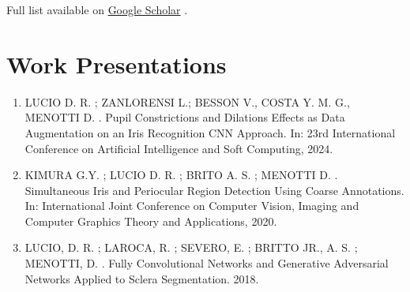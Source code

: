 \documentclass[12pt,a4paper,sans]{moderncv}        %
\begin{document}
\vspace{8pt}
Full list available on \href{https://scholar.google.com.br/citations?user=FS_momQAAAAJ&hl=en}{Google Scholar} .

\vspace{12pt}
\section{Work Presentations}

\begin{enumerate}
    \item LUCIO D. R. ; ZANLORENSI L.; BESSON V., COSTA Y. M. G., MENOTTI D. . Pupil Constrictions and Dilations Effects as Data Augmentation on an Iris Recognition CNN Approach. In: 23rd International Conference on Artificial Intelligence and Soft Computing, 2024.

    \item KIMURA G.Y. ; LUCIO D. R. ; BRITO A. S. ; MENOTTI D. . Simultaneous Iris and Periocular Region Detection Using Coarse Annotations. In: International Joint Conference on Computer Vision, Imaging and Computer Graphics Theory and Applications, 2020.

    \item LUCIO, D. R. ; LAROCA, R. ; SEVERO, E. ; BRITTO JR., A. S. ; MENOTTI, D. . Fully Convolutional Networks and Generative Adversarial Networks Applied to Sclera Segmentation. 2018.

\end{enumerate}
\end{document}
